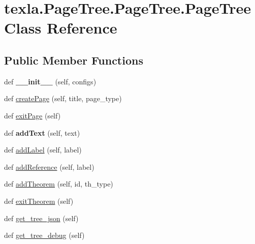 \hypertarget{classtexla_1_1PageTree_1_1PageTree_1_1PageTree}{}\section{texla.\+Page\+Tree.\+Page\+Tree.\+Page\+Tree Class Reference}
\label{classtexla_1_1PageTree_1_1PageTree_1_1PageTree}
\subsection*{Public Member Functions}
\begin{DoxyCompactItemize}
\item 
\hypertarget{classtexla_1_1PageTree_1_1PageTree_1_1PageTree_a163c567fb96bf817e560a5ceb37c9ccf}{}\label{classtexla_1_1PageTree_1_1PageTree_1_1PageTree_a163c567fb96bf817e560a5ceb37c9ccf} 
def {\bfseries \+\_\+\+\_\+init\+\_\+\+\_\+} (self, configs)
\item 
def \hyperlink{classtexla_1_1PageTree_1_1PageTree_1_1PageTree_a9df0c1cd2ebc4c0e0af693c49c084324}{create\+Page} (self, title, page\+\_\+type)
\item 
def \hyperlink{classtexla_1_1PageTree_1_1PageTree_1_1PageTree_adfd53d92c57eefb5d956cc1c3e646373}{exit\+Page} (self)
\item 
\hypertarget{classtexla_1_1PageTree_1_1PageTree_1_1PageTree_a1d56ecdff92229338afad2c7397c8010}{}\label{classtexla_1_1PageTree_1_1PageTree_1_1PageTree_a1d56ecdff92229338afad2c7397c8010} 
def {\bfseries add\+Text} (self, text)
\item 
def \hyperlink{classtexla_1_1PageTree_1_1PageTree_1_1PageTree_a7b0b920255477e1c0cf155147ded847a}{add\+Label} (self, label)
\item 
def \hyperlink{classtexla_1_1PageTree_1_1PageTree_1_1PageTree_ac5f3e4e6283924a193a513b2d9289c27}{add\+Reference} (self, label)
\item 
def \hyperlink{classtexla_1_1PageTree_1_1PageTree_1_1PageTree_ab34f6b054c920675e93f6e29694d54bf}{add\+Theorem} (self, id, th\+\_\+type)
\item 
def \hyperlink{classtexla_1_1PageTree_1_1PageTree_1_1PageTree_a6f720d497af55d8ccdeadb779d6a61bc}{exit\+Theorem} (self)
\item 
def \hyperlink{classtexla_1_1PageTree_1_1PageTree_1_1PageTree_aa01020f0c674d653538d819e6f1ca231}{get\+\_\+tree\+\_\+json} (self)
\item 
def \hyperlink{classtexla_1_1PageTree_1_1PageTree_1_1PageTree_ab6d7f8cb1defc5738cac8da13de74809}{get\+\_\+tree\+\_\+debug} (self)

\end{DoxyCompactItemize}
